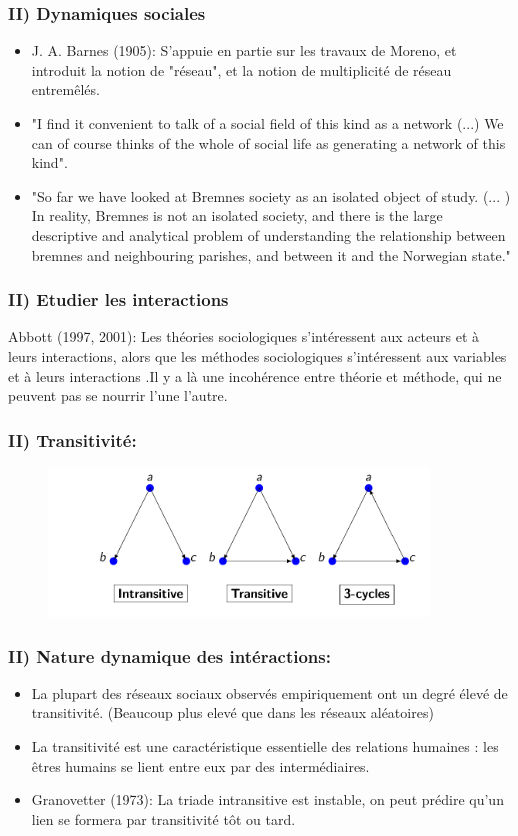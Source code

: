 \documentclass{beamer}
\begin{document}
\begin{frame}
    \frametitle{II) Dynamiques sociales}
    \begin{itemize}
        \item J. A. Barnes (1905): S'appuie en partie sur les travaux de Moreno, et introduit la notion de "réseau", et la notion de multiplicité de réseau entremêlés. 
        \item "I find it convenient to talk of a social field of this kind as a network (...) We can of course thinks of the whole of social life as generating a network of this kind".
        \item "So far we have looked at Bremnes society as an isolated object of study. (... ) In reality, Bremnes is not an isolated society, and there is the large descriptive and analytical problem of understanding the relationship between bremnes and neighbouring parishes, and between it and the Norwegian state."
    \end{itemize}
\end{frame}

\begin{frame}
    \frametitle{II) Etudier les interactions}
    Abbott (1997, 2001): Les théories sociologiques s’intéressent aux
    acteurs et à leurs interactions, alors que les méthodes sociologiques s’intéressent aux variables et à leurs interactions .Il y a là une incohérence entre théorie et méthode, qui ne peuvent pas se nourrir l’une l’autre.
\end{frame}

\begin{frame}
    \frametitle{II) Transitivité:}
    \begin{figure}
        \centering
        \includegraphics[width = 0.9\textwidth]{triades_transitivite.png}
      \end{figure}
\end{frame}

\begin{frame}
    \frametitle{II) Nature dynamique des intéractions:}
    \begin{itemize}
        \item La plupart des réseaux sociaux observés empiriquement ont un degré élevé de transitivité. (Beaucoup plus elevé que dans les réseaux aléatoires)
        \item La transitivité est une caractéristique essentielle des relations humaines : les êtres humains se lient entre eux par des intermédiaires.
        \item Granovetter (1973): La triade intransitive est instable, on peut prédire qu’un lien se formera par transitivité tôt ou tard.
    \end{itemize}
\end{frame}
\end{document}
